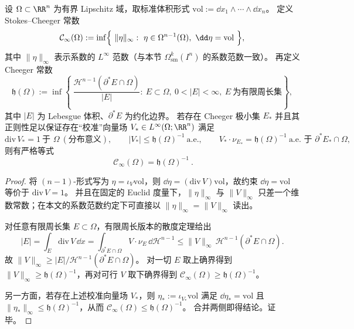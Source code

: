 \begin{proposition}\label{prop:spg-cheeger-stokes-duality}
设 \(\Omega\subset\RR^n\) 为有界 Lipschitz 域，取标准体积形式 \(\mathrm{vol}:=\dd x_1\wedge\cdots\wedge \dd x_n\)。
定义 Stokes--Cheeger 常数
\[
\mathcal{C}_\infty(\Omega)
:=\inf\Bigl\{\ \|\eta\|_\infty:\ \eta\in \Omega^{n-1}(\Omega),\ \dd\eta=\mathrm{vol}\ \Bigr\},
\]
其中 \(\|\eta\|_\infty\) 表示系数的 \(L^\infty\) 范数（与本节 \(\Omega^k_{\mathrm{sm}}(I^n)\) 的系数范数一致）。
再定义 Cheeger 常数
\[
\mathfrak h(\Omega)
:=\inf\left\{\ \frac{\mathcal H^{n-1}(\partial^\ast E\cap \Omega)}{|E|}:\ E\subset\Omega,\ 0<|E|<\infty,\ E\ \text{为有限周长集}\right\},
\]
其中 \(|E|\) 为 Lebesgue 体积、\(\partial^\ast E\) 为约化边界。
若存在 Cheeger 极小集 \(E_\ast\) 并且其正则性足以保证存在“校准”向量场 \(V_\ast\in L^\infty(\Omega;\RR^n)\) 满足
\[
\mathrm{div}\,V_\ast=1\ \text{于 }\Omega\ (\text{分布意义}),\qquad
|V_\ast|\le \mathfrak h(\Omega)^{-1}\ \text{a.e.},\qquad
V_\ast\cdot\nu_{E_\ast}=\mathfrak h(\Omega)^{-1}\ \text{a.e. 于 }\partial^\ast E_\ast\cap\Omega,
\]
则有严格等式
\[
\boxed{\ \mathcal{C}_\infty(\Omega)=\mathfrak h(\Omega)^{-1}\ }.
\]
\end{proposition}
\begin{proof}
将 \((n{-}1)\)-形式写为 \(\eta=\iota_V\mathrm{vol}\)，则 \(\dd\eta=(\mathrm{div}\,V)\mathrm{vol}\)，故约束 \(\dd\eta=\mathrm{vol}\) 等价于 \(\mathrm{div}\,V=1\)。
并且在固定的 Euclid 度量下，\(\|\eta\|_\infty\) 与 \(\|V\|_\infty\) 只差一个维数常数；在本文的系数范数约定下可直接以 \(\|\eta\|_\infty=\|V\|_\infty\) 读出。
\par
对任意有限周长集 \(E\subset\Omega\)，有限周长版本的散度定理给出
\[
|E|=\int_E \mathrm{div}\,V\,\dd x=\int_{\partial^\ast E\cap\Omega}V\cdot\nu_E\,\dd\mathcal H^{n-1}
\le \|V\|_\infty\,\mathcal H^{n-1}(\partial^\ast E\cap\Omega).
\]
故 \(\|V\|_\infty\ge |E|/\mathcal H^{n-1}(\partial^\ast E\cap\Omega)\)。
对一切 \(E\) 取上确界得到 \(\|V\|_\infty\ge \mathfrak h(\Omega)^{-1}\)，再对可行 \(V\) 取下确界得到
\(
\mathcal{C}_\infty(\Omega)\ge \mathfrak h(\Omega)^{-1}
\)。
\par
另一方面，若存在上述校准向量场 \(V_\ast\)，则 \(\eta_\ast:=\iota_{V_\ast}\mathrm{vol}\) 满足 \(\dd\eta_\ast=\mathrm{vol}\) 且 \(\|\eta_\ast\|_\infty\le \mathfrak h(\Omega)^{-1}\)，从而
\(
\mathcal{C}_\infty(\Omega)\le \mathfrak h(\Omega)^{-1}
\)。
合并两侧即得结论。证毕。
\end{proof}

